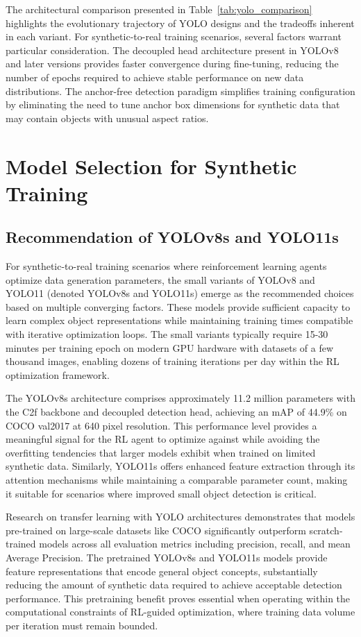 The architectural comparison presented in Table~\ref{tab:yolo_comparison} highlights the evolutionary trajectory of YOLO designs and the tradeoffs inherent in each variant. For synthetic-to-real training scenarios, several factors warrant particular consideration. The decoupled head architecture present in YOLOv8 and later versions provides faster convergence during fine-tuning, reducing the number of epochs required to achieve stable performance on new data distributions. The anchor-free detection paradigm simplifies training configuration by eliminating the need to tune anchor box dimensions for synthetic data that may contain objects with unusual aspect ratios.

\section{Model Selection for Synthetic Training}
\label{sec:model_selection}

\subsection{Recommendation of YOLOv8s and YOLO11s}

For synthetic-to-real training scenarios where reinforcement learning agents optimize data generation parameters, the small variants of YOLOv8 and YOLO11 (denoted YOLOv8s and YOLO11s) emerge as the recommended choices based on multiple converging factors. These models provide sufficient capacity to learn complex object representations while maintaining training times compatible with iterative optimization loops. The small variants typically require 15-30 minutes per training epoch on modern GPU hardware with datasets of a few thousand images, enabling dozens of training iterations per day within the RL optimization framework.

The YOLOv8s architecture comprises approximately 11.2 million parameters with the C2f backbone and decoupled detection head, achieving an mAP of 44.9\% on COCO val2017 at 640 pixel resolution. This performance level provides a meaningful signal for the RL agent to optimize against while avoiding the overfitting tendencies that larger models exhibit when trained on limited synthetic data. Similarly, YOLO11s offers enhanced feature extraction through its attention mechanisms while maintaining a comparable parameter count, making it suitable for scenarios where improved small object detection is critical.

Research on transfer learning with YOLO architectures demonstrates that models pre-trained on large-scale datasets like COCO significantly outperform scratch-trained models across all evaluation metrics including precision, recall, and mean Average Precision. The pretrained YOLOv8s and YOLO11s models provide feature representations that encode general object concepts, substantially reducing the amount of synthetic data required to achieve acceptable detection performance. This pretraining benefit proves essential when operating within the computational constraints of RL-guided optimization, where training data volume per iteration must remain bounded.

